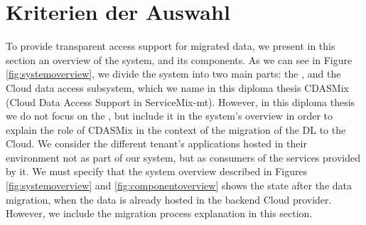 \section{Kriterien der Auswahl}
\label{sec:KriterienderAuswahl}





To provide transparent access support for migrated data, we present in this section an overview of the system, and its components. As we can see in Figure \ref{fig:systemoverview}, we divide the system into two main parts: the , and the Cloud data access subsystem, which we name in this diploma thesis CDASMix (Cloud Data Access Support in ServiceMix-mt). However, in this diploma thesis we do not focus on the , but include it in the system's overview in order to explain the role of CDASMix in the context of the migration of the DL to the Cloud. We consider the different tenant's applications hosted in their environment not as part of our system, but as consumers of the services provided by it. We must specify that the system overview described in Figures \ref{fig:systemoverview} and \ref{fig:componentoverview} shows the state after the data migration, when the data is already hosted in the backend Cloud provider. However, we include the migration process explanation in this section.

